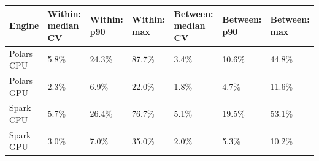 \begin{tabular}{lllllll}
\toprule
Engine & Within: median CV & Within: p90 & Within: max & Between: median CV & Between: p90 & Between: max \\
\midrule
Polars CPU & 5.8\% & 24.3\% & 87.7\% & 3.4\% & 10.6\% & 44.8\% \\
Polars GPU & 2.3\% & 6.9\% & 22.0\% & 1.8\% & 4.7\% & 11.6\% \\
Spark CPU & 5.7\% & 26.4\% & 76.7\% & 5.1\% & 19.5\% & 53.1\% \\
Spark GPU & 3.0\% & 7.0\% & 35.0\% & 2.0\% & 5.3\% & 10.2\% \\
\bottomrule
\end{tabular}
